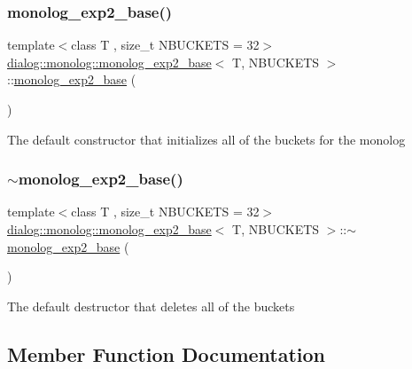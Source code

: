 \subsubsection{\texorpdfstring{monolog\+\_\+exp2\+\_\+base()}{monolog\_exp2\_base()}}
{\footnotesize\ttfamily template$<$class T , size\+\_\+t N\+B\+U\+C\+K\+E\+TS = 32$>$ \\
\hyperlink{classdialog_1_1monolog_1_1monolog__exp2__base}{dialog\+::monolog\+::monolog\+\_\+exp2\+\_\+base}$<$ T, N\+B\+U\+C\+K\+E\+TS $>$\+::\hyperlink{classdialog_1_1monolog_1_1monolog__exp2__base}{monolog\+\_\+exp2\+\_\+base} (\begin{DoxyParamCaption}{ }\end{DoxyParamCaption})\hspace{0.3cm}{\ttfamily [inline]}}

The default constructor that initializes all of the buckets for the monolog \mbox{\label{classdialog_1_1monolog_1_1monolog__exp2__base_a4af0cf1b148d7b832d180da5c9ad389f}} 
\subsubsection{\texorpdfstring{$\sim$monolog\+\_\+exp2\+\_\+base()}{~monolog\_exp2\_base()}}
{\footnotesize\ttfamily template$<$class T , size\+\_\+t N\+B\+U\+C\+K\+E\+TS = 32$>$ \\
\hyperlink{classdialog_1_1monolog_1_1monolog__exp2__base}{dialog\+::monolog\+::monolog\+\_\+exp2\+\_\+base}$<$ T, N\+B\+U\+C\+K\+E\+TS $>$\+::$\sim$\hyperlink{classdialog_1_1monolog_1_1monolog__exp2__base}{monolog\+\_\+exp2\+\_\+base} (\begin{DoxyParamCaption}{ }\end{DoxyParamCaption})\hspace{0.3cm}{\ttfamily [inline]}}

The default destructor that deletes all of the buckets 

\subsection{Member Function Documentation}
\mbox{\label{classdialog_1_1monolog_1_1monolog__exp2__base_a86dd772a9b7beee2503a2349619a99ab}} 
